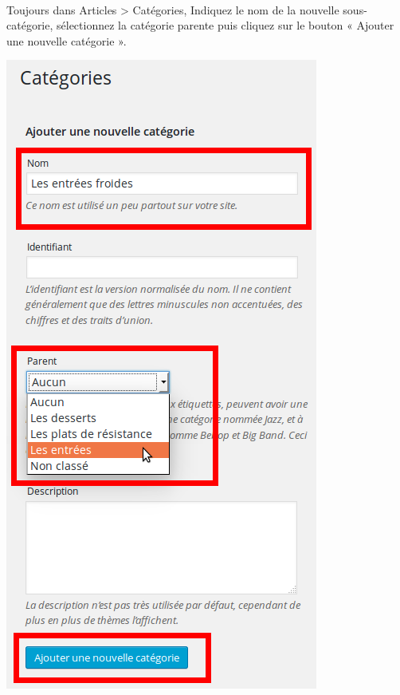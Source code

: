 \documentclass[10pt,a4paper]{article}
\begin{document}
\paragraph{}Toujours dans Articles > Catégories, Indiquez le nom de la nouvelle sous-catégorie, sélectionnez la catégorie parente puis cliquez sur le bouton « Ajouter une nouvelle catégorie ».
\begin{center}
\includegraphics[scale=0.3]{img/0093.png}
\end{center}
\end{document}
